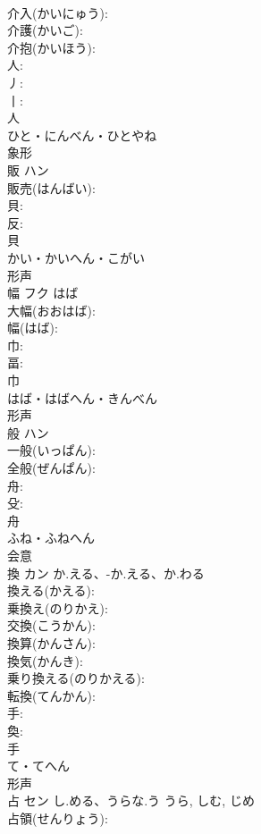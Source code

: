 \documentclass[8pt]{extreport}
\begin{document}
\begin{CJK}{UTF8}{min}
\\	介入(かいにゅう): 
\\	介護(かいご): 
\\	介抱(かいほう): 
\\	人: 
\\	丿: 
\\	丨: 
\\	人	
\\	ひと・にんべん・ひとやね	
\\	象形 
\\	販	ハン			
\\	販売(はんばい): 
\\	貝: 
\\	反: 
\\	貝	
\\	かい・かいへん・こがい	
\\	形声 
\\	幅	フク	はば		
\\	大幅(おおはば): 
\\	幅(はば): 
\\	巾: 
\\	畐: 
\\	巾	
\\	はば・はばへん・きんべん	
\\	形声 
\\	般	ハン			
\\	一般(いっぱん): 
\\	全般(ぜんぱん): 
\\	舟: 
\\	殳: 
\\	舟	
\\	ふね・ふねへん	
\\	会意 
\\	換	カン	か.える、-か.える、か.わる		
\\	換える(かえる): 
\\	乗換え(のりかえ): 
\\	交換(こうかん): 
\\	換算(かんさん): 
\\	換気(かんき): 
\\	乗り換える(のりかえる): 
\\	転換(てんかん): 
\\	手: 
\\	奐: 
\\	手	
\\	て・てへん	
\\	形声 
\\	占	セン	し.める、うらな.う	うら, しむ, じめ	
\\	占領(せんりょう): 

\end{CJK}
\end{document}
